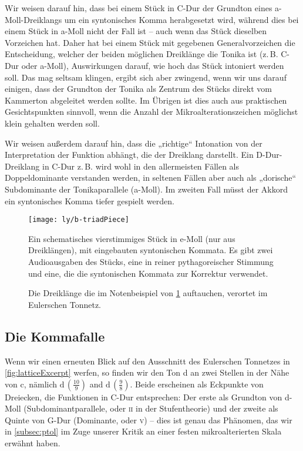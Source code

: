 Wir weisen darauf hin, dass bei einem Stück in C-Dur der Grundton eines
a-Moll-Dreiklangs um ein syntonisches Komma herabgesetzt wird, während dies bei
einem Stück in a-Moll nicht der Fall ist – auch wenn das Stück dieselben
Vorzeichen hat. Daher hat bei einem Stück mit gegebenen Generalvorzeichen die
Entscheidung, welcher der beiden möglichen Dreiklänge die Tonika ist
(z.\,B. C-Dur oder a-Moll), Auswirkungen darauf, wie hoch das Stück intoniert
werden soll. Das mag seltsam klingen, ergibt sich aber zwingend, wenn wir uns
darauf einigen, dass der Grundton der Tonika als Zentrum des Stücks direkt vom
Kammerton abgeleitet werden sollte. Im Übrigen ist dies auch aus praktischen
Gesichtspunkten sinnvoll, wenn die Anzahl der Mikroalterationszeichen möglichst
klein gehalten werden soll.

Wir weisen außerdem darauf hin, dass die „richtige“ Intonation von der
Interpretation der Funktion abhängt, die der Dreiklang darstellt. Ein
D-Dur-Dreiklang in C-Dur z.\,B.  wird wohl in den allermeisten Fällen als
Doppeldominante verstanden werden, in seltenen Fällen aber auch als „dorische“
Subdominante der Tonikaparallele (a-Moll). Im zweiten Fall müsst der Akkord ein
syntonisches Komma tiefer gespielt werden.

\begin{figure}
  \centering
  \texttt{[image: ly/b-triadPiece]}
  \caption{Ein schematisches vierstimmiges Stück in e-Moll (nur aus
  	Dreiklängen), mit eingebauten syntonischen Kommata. Es gibt zwei
  	Audioausgaben des Stücks, eine in reiner pythagoreischer Stimmung und eine,
  	die die syntonischen Kommata zur Korrektur
  	verwendet.}\label{fig:triadPiece}
\end{figure}

\begin{figure}
  
  \caption{Die Dreiklänge die im Notenbeispiel von \cref{fig:triadPiece} auftauchen, verortet im
  	Eulerschen Tonnetz.}\label{fig:chordsLattice}
\end{figure}

\subsection{Die Kommafalle}

Wenn wir einen erneuten Blick auf den Ausschnitt des Eulerschen Tonnetzes in
\cref{fig:latticeExcerpt} werfen, so finden wir den Ton d an zwei Stellen in der
Nähe von c, nämlich \naturalm $\text{d}\,(\frac{10}9)$ and
$\text{d}\,(\frac98)$. Beide erscheinen als Eckpunkte von Dreiecken, die
Funktionen in C-Dur entsprechen: Der erste als Grundton von d-Moll
(Subdominantparallele, oder \textsc{ii} in der Stufentheorie) und der zweite als
Quinte von G-Dur (Dominante, oder \textsc{v}) – dies ist genau das Phänomen, das
wir in \cref{subsec:ptol} im Zuge unserer Kritik an einer festen
mikroalterierten Skala erwähnt haben.

